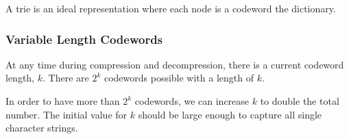 A trie is an ideal representation where each node is a codeword the dictionary.

\subsubsection{Variable Length Codewords}\label{ssub:variable_length_codewords}

At any time during compression and decompression, there is a current codeword length, \(k\).
There are \(2^{k}\) codewords possible with a length of \(k\).

In order to have more than \(2^{k}\) codewords, we can increase \(k\) to double the total number.
The initial value for \(k\) should be large enough to capture all single character strings.

